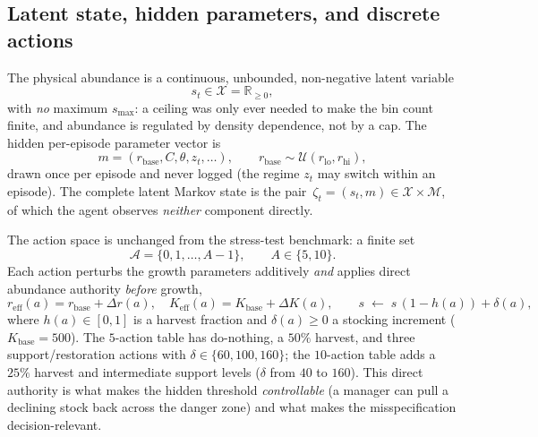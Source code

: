 \documentclass[11pt]{article}
\newcommand{\reff}{r_{\mathrm{eff}}}
\newcommand{\Keff}{K_{\mathrm{eff}}}
\newcommand{\rbase}{r_{\mathrm{base}}}
\newcommand{\Kbase}{K_{\mathrm{base}}}
\begin{document}
\subsection{Latent state, hidden parameters, and discrete actions}
The physical abundance is a continuous, unbounded, non-negative latent variable
\begin{equation}
s_t \in \mathcal{X} = \mathbb{R}_{\ge 0},
\end{equation}
with \emph{no} maximum $s_{\max}$: a ceiling was only ever needed to make the bin
count finite, and abundance is regulated by density dependence, not by a cap. The
hidden per-episode parameter vector is
\begin{equation}
m = (\rbase, C, \theta, z_t, \dots), \qquad
\rbase \sim \mathcal{U}(r_{\mathrm{lo}}, r_{\mathrm{hi}}),
\end{equation}
drawn once per episode and never logged (the regime $z_t$ may switch within an
episode). The complete latent Markov state is the pair $\,\zeta_t = (s_t, m) \in
\mathcal{X}\times\mathcal{M}$, of which the agent observes \emph{neither}
component directly.

The action space is unchanged from the stress-test benchmark: a finite set
\begin{equation}
\mathcal{A} = \{0,1,\dots,A-1\}, \qquad A \in \{5,10\}.
\end{equation}
Each action perturbs the growth parameters additively \emph{and} applies direct
abundance authority \emph{before} growth,
\begin{equation}
\reff(a) = \rbase + \Delta r(a), \quad \Keff(a) = \Kbase + \Delta K(a), \qquad
s \;\leftarrow\; s\,(1 - h(a)) + \delta(a),
\label{eq:authority}
\end{equation}
where $h(a)\in[0,1]$ is a harvest fraction and $\delta(a)\ge 0$ a stocking
increment ($\Kbase = 500$). The $5$-action table has do-nothing, a $50\%$ harvest,
and three support/restoration actions with $\delta\in\{60,100,160\}$; the
$10$-action table adds a $25\%$ harvest and intermediate support levels
($\delta$ from $40$ to $160$). This direct authority is what makes the hidden
threshold \emph{controllable} (a manager can pull a declining stock back across
the danger zone) and what makes the misspecification decision-relevant.
\end{document}
